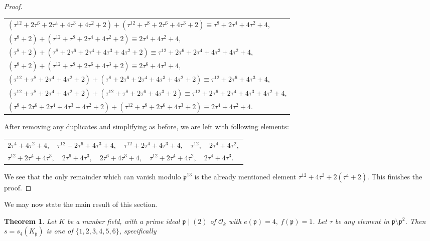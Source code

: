 \documentclass[12pt]{article}
\newtheorem{thm}{Theorem}[section]
\theoremstyle{remark}
\newcommand{\p}{\mathfrak{p}}
\newcommand{\OO}{\mathcal{O}}
\begin{document}
\begin{proof}
\begin{center}
\begin{tabular}{@{}l@{}}
    $(\tau^{12}+ 2\tau^6 + 2\tau^4 + 4\tau^3 + 4\tau^2 + 2) + (\tau^{12}+\tau^8+2\tau^6+4\tau^3+2) \equiv \tau^{8}+2\tau^4+4\tau^2+4$,\\
    $(\tau^8 + 2) + (\tau^{12}+\tau^8+2\tau^4+4\tau^2+2) \equiv 2\tau^4+4\tau^2+4$, \\
    $(\tau^8 + 2) + (\tau^8+2\tau^6+2\tau^4+4\tau^3+4\tau^2+2) \equiv \tau^{12}+2\tau^6+2\tau^4+4\tau^3+4\tau^2+4$,  \\
    $(\tau^8 + 2) + (\tau^{12}+\tau^8+2\tau^6+4\tau^3+2) \equiv 2\tau^6+4\tau^3+4$,\\
    $(\tau^{12}+\tau^8+2\tau^4+4\tau^2+2) + (\tau^8+2\tau^6+2\tau^4+4\tau^3+4\tau^2+2) \equiv \tau^{12}+2\tau^6+4\tau^3+4$,\\
    $(\tau^{12}+\tau^8+2\tau^4+4\tau^2+2) + (\tau^{12}+\tau^8+2\tau^6+4\tau^3+2) \equiv \tau^{12}+2\tau^6+2\tau^4+4\tau^3+4\tau^2+4$,\\
    $(\tau^8+2\tau^6+2\tau^4+4\tau^3+4\tau^2+2) + (\tau^{12}+\tau^8+2\tau^6+4\tau^3+2) \equiv 2\tau^4+4\tau^2+4$.
    
\end{tabular}
\end{center}
After removing any duplicates and simplifying as before, we are left with following elements:

\begin{center}
\begin{tabular}{@{}l@{}}
    $2\tau^4+4\tau^2+4, \quad \tau^{12}+2\tau^6+4\tau^3+4, \quad 
    \tau^{12}+2\tau^4+4\tau^3+4, \quad \tau^{12}, \quad 2\tau^4+4\tau^2,$\\
    $\tau^{12}+2\tau^4+4\tau^3, \quad 2\tau^6+4\tau^3, \quad
    2\tau^6+4\tau^3+4, \quad \tau^{12}+2\tau^4+4\tau^2, \quad 2\tau^4+4\tau^3.$
\end{tabular}
\end{center}
We see that the only remainder which can vanish modulo $\mathfrak{p}^{13}$ is the already mentioned element $\tau^{12} + 4\tau^3+2(\tau^4+2)$. This finishes the proof.
\end{proof}




We may now state the main result of this section.
\begin{thm}\label{main}
Let $K$ be a number field, with a prime ideal $\p \mid (2)$ of $\OO_k$ with $e(\p) = 4, \ f(\p)=1$. Let $\tau$ be any element in $\mathfrak{p}\setminus \mathfrak{p}^2$. Then $s = s_4(K_{\mathfrak{p}})$ is one of $\{1,2,3,4,5,6\}$, specifically
\end{thm}
\end{document}

